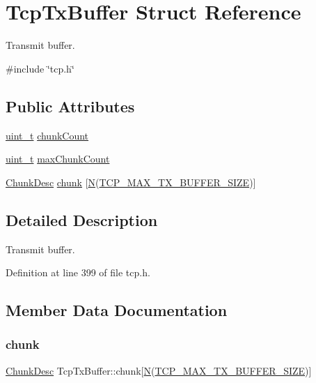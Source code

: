 \hypertarget{structTcpTxBuffer}{}\section{Tcp\+Tx\+Buffer Struct Reference}
\label{structTcpTxBuffer}


Transmit buffer.  




{\ttfamily \#include \char`\"{}tcp.\+h\char`\"{}}

\subsection*{Public Attributes}
\begin{DoxyCompactItemize}
\item 
\hyperlink{compiler__port_8h_a12a1e9b3ce141648783a82445d02b58d}{uint\+\_\+t} \hyperlink{structTcpTxBuffer_a38b16c419c204f70da1d12996eee3cc3}{chunk\+Count}
\item 
\hyperlink{compiler__port_8h_a12a1e9b3ce141648783a82445d02b58d}{uint\+\_\+t} \hyperlink{structTcpTxBuffer_ab514b670a5df5e06161daaff5663d255}{max\+Chunk\+Count}
\item 
\hyperlink{structChunkDesc}{Chunk\+Desc} \hyperlink{structTcpTxBuffer_a560e0c510abb91838587a5c2d9716cf0}{chunk} \mbox{[}\hyperlink{net__mem_8h_a5d7f6248b8dd365190e7562d4e14a4f3}{N}(\hyperlink{tcp_8h_a85c483022d7093f56ad49e0f7373c432}{T\+C\+P\+\_\+\+M\+A\+X\+\_\+\+T\+X\+\_\+\+B\+U\+F\+F\+E\+R\+\_\+\+S\+I\+ZE})\mbox{]}
\end{DoxyCompactItemize}


\subsection{Detailed Description}
Transmit buffer. 

Definition at line 399 of file tcp.\+h.



\subsection{Member Data Documentation}
\mbox{\label{structTcpTxBuffer_a560e0c510abb91838587a5c2d9716cf0}} 
\subsubsection{\texorpdfstring{chunk}{chunk}}
{\footnotesize\ttfamily \hyperlink{structChunkDesc}{Chunk\+Desc} Tcp\+Tx\+Buffer\+::chunk\mbox{[}\hyperlink{net__mem_8h_a5d7f6248b8dd365190e7562d4e14a4f3}{N}(\hyperlink{tcp_8h_a85c483022d7093f56ad49e0f7373c432}{T\+C\+P\+\_\+\+M\+A\+X\+\_\+\+T\+X\+\_\+\+B\+U\+F\+F\+E\+R\+\_\+\+S\+I\+ZE})\mbox{]}}



